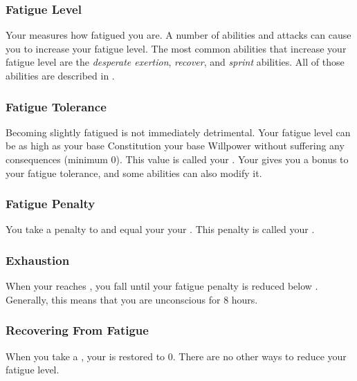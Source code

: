         \subsubsection{Fatigue Level}\label{Fatigue Level}
            Your  measures how fatigued you are.
            A number of abilities and attacks can cause you to increase your fatigue level.
            The most common abilities that increase your fatigue level are the \textit{desperate exertion}, \textit{recover}, and \textit{sprint} abilities.
            All of those abilities are described in .

            \subsubsection{Fatigue Tolerance}\label{Fatigue Tolerance}
                Becoming slightly fatigued is not immediately detrimental.
                Your fatigue level can be as high as your base Constitution \add your base Willpower without suffering any consequences (minimum 0).
                This value is called your .
                Your  gives you a bonus to your fatigue tolerance, and some abilities can also modify it.

            \subsubsection{Fatigue Penalty}\label{Fatigue Penalty}
                You take a penalty to  and  equal your  \sub your .
                This penalty is called your .

        \subsubsection{Exhaustion}\label{Exhaustion}
            When your  reaches , you fall \unconscious until your fatigue penalty is reduced below .
            Generally, this means that you are unconscious for 8 hours.

        \subsubsection{Recovering From Fatigue}
            When you take a , your  is restored to 0.
            There are no other ways to reduce your fatigue level.

